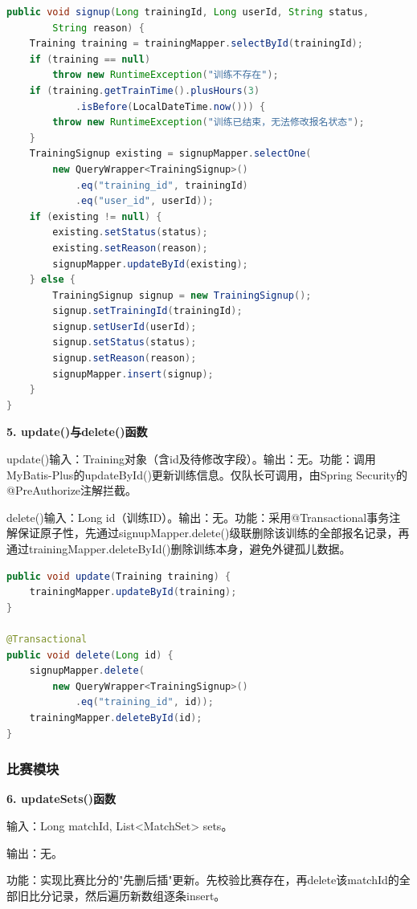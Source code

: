 \documentclass[12pt,a4paper]{ctexart}
\begin{document}
\begin{lstlisting}[language=Java]
public void signup(Long trainingId, Long userId, String status,
        String reason) {
    Training training = trainingMapper.selectById(trainingId);
    if (training == null)
        throw new RuntimeException("训练不存在");
    if (training.getTrainTime().plusHours(3)
            .isBefore(LocalDateTime.now())) {
        throw new RuntimeException("训练已结束，无法修改报名状态");
    }
    TrainingSignup existing = signupMapper.selectOne(
        new QueryWrapper<TrainingSignup>()
            .eq("training_id", trainingId)
            .eq("user_id", userId));
    if (existing != null) {
        existing.setStatus(status);
        existing.setReason(reason);
        signupMapper.updateById(existing);
    } else {
        TrainingSignup signup = new TrainingSignup();
        signup.setTrainingId(trainingId);
        signup.setUserId(userId);
        signup.setStatus(status);
        signup.setReason(reason);
        signupMapper.insert(signup);
    }
}
\end{lstlisting}

\textbf{5. update()与delete()函数}

update()输入：Training对象（含id及待修改字段）。输出：无。功能：调用MyBatis-Plus的updateById()更新训练信息。仅队长可调用，由Spring Security的@PreAuthorize注解拦截。

delete()输入：Long id（训练ID）。输出：无。功能：采用@Transactional事务注解保证原子性，先通过signupMapper.delete()级联删除该训练的全部报名记录，再通过trainingMapper.deleteById()删除训练本身，避免外键孤儿数据。

\begin{lstlisting}[language=Java]
public void update(Training training) {
    trainingMapper.updateById(training);
}

@Transactional
public void delete(Long id) {
    signupMapper.delete(
        new QueryWrapper<TrainingSignup>()
            .eq("training_id", id));
    trainingMapper.deleteById(id);
}
\end{lstlisting}

\subsubsection{比赛模块}

\textbf{6. updateSets()函数}

输入：Long matchId, List<MatchSet> sets。

输出：无。

功能：实现比赛比分的"先删后插"更新。先校验比赛存在，再delete该matchId的全部旧比分记录，然后遍历新数组逐条insert。
\end{document}
